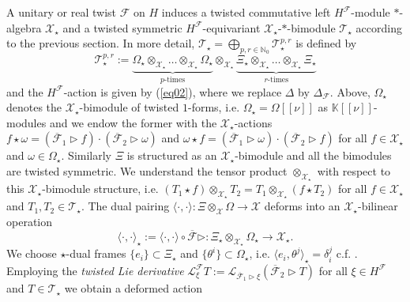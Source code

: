 \documentclass[a4paper,11pt]{article}
\begin{document}
A unitary or real twist $\mathcal{F}$ on $H$ induces a twisted commutative
left $H^\mathcal{F}$-module $*$-algebra $\mathcal{X}_\star$ and a twisted symmetric
$H^\mathcal{F}$-equivariant $\mathcal{X}_\star$-$*$-bimodule $\mathcal{T}_\star$
according to the previous section. In more detail, $\mathcal{T}_\star
=\bigoplus_{p,r\in\mathbb{N}_0}\mathcal{T}_\star^{p,r}$ is defined by
\begin{equation}
    \mathcal{T}_\star^{p,r}:=
    \underbrace{\Omega_\star\otimes_{\mathcal{X}_\star}
    \ldots\otimes_{\mathcal{X}_\star}\Omega_\star}_{p\text{-times}}
    \otimes_{\mathcal{X}_\star}
    \underbrace{\Xi_\star\otimes_{\mathcal{X}_\star}
    \ldots\otimes_{\mathcal{X}_\star}\Xi_\star}_{r\text{-times}}
\end{equation}
and the $H^\mathcal{F}$-action is given by (\ref{eq02}), where we replace $\Delta$
by $\Delta_\mathcal{F}$.
Above, $\Omega_\star$ denotes the $\mathcal{X}_\star$-bimodule of twisted $1$-forms,
i.e. $\Omega_\star=\Omega[[\nu]]$ as $\mathbb{K}[[\nu]]$-modules and we endow the former
with the $\mathcal{X}_\star$-actions
$f\star\omega=(\overline{\mathcal{F}}_1\rhd f)\cdot(\overline{\mathcal{F}}_2\rhd\omega)$
and
$\omega\star f=(\overline{\mathcal{F}}_1\rhd\omega)\cdot(\overline{\mathcal{F}}_2\rhd f)$
for all $f\in\mathcal{X}_\star$ and $\omega\in\Omega_\star$. Similarly $\Xi$ is structured
as an $\mathcal{X}_\star$-bimodule and all the bimodules are twisted symmetric.
We understand the tensor product $\otimes_{\mathcal{X}_\star}$ with respect to this
$\mathcal{X}_\star$-bimodule structure, i.e. $(T_1\star f)\otimes_{\mathcal{X}_\star}T_2
=T_1\otimes_{\mathcal{X}_\star}(f\star T_2)$ for all $f\in\mathcal{X}_\star$ and
$T_1,T_2\in\mathcal{T}_\star$. The dual pairing
$\langle\cdot,\cdot\rangle\colon\Xi\otimes_\mathcal{X}\Omega\rightarrow\mathcal{X}$
deforms into an $\mathcal{X}_\star$-bilinear operation
\begin{equation}
    \langle\cdot,\cdot\rangle_\star
    :=\langle\cdot,\cdot\rangle\circ\overline{\mathcal{F}}\rhd
    \colon\Xi_\star\otimes_{\mathcal{X}_\star}\Omega_\star\rightarrow\mathcal{X}_\star.
\end{equation}
We choose $\star$-dual frames $\{e_i\}\subset\Xi_\star$ and
$\{\theta^i\}\subset\Omega_\star$, i.e. $\langle e_i,\theta^j\rangle_\star=\delta_i^j$
c.f. \cite{Aschieri2006}.
Employing the \textit{twisted Lie derivative} $\mathcal{L}^\mathcal{F}_\xi T
:=\mathcal{L}_{\overline{\mathcal{F}}_1\rhd\xi}(\overline{\mathcal{F}}_2\rhd T)$
for all $\xi\in H^\mathcal{F}$ and $T\in\mathcal{T}_\star$ we obtain a deformed action
\end{document}
